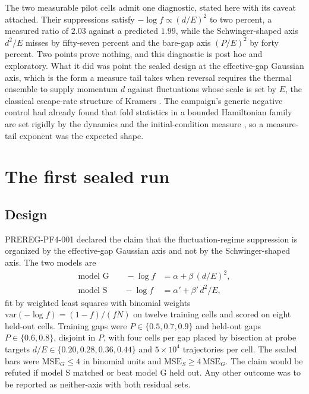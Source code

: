 \documentclass[aps,prd,reprint,nofootinbib,longbibliography]{revtex4-2}
\begin{document}
The two measurable pilot cells admit one diagnostic, stated here with its
caveat attached.  Their suppressions satisfy
$-\log f \propto (d/E)^{2}$ to two percent, a measured ratio of $2.03$
against a predicted $1.99$, while the Schwinger-shaped axis $d^{2}/E$
misses by fifty-seven percent and the bare-gap axis $(P/E)^{2}$ by forty
percent.  Two points prove nothing, and this diagnostic is post hoc and
exploratory.  What it did was point the sealed design at the effective-gap
Gaussian axis, which is the form a measure tail takes when reversal
requires the thermal ensemble to supply momentum $d$ against fluctuations
whose scale is set by $E$, the classical escape-rate structure of Kramers
\cite{Kramers1940}.  The campaign's generic negative control had already
found that fold statistics in a bounded Hamiltonian family are set
rigidly by the dynamics and the initial-condition measure
\cite{ZenodoEntropy}, so a measure-tail exponent was the expected shape.

\section{The first sealed run}
\label{sec:run1}

\subsection{Design}

PREREG-PF4-001 declared the claim that the fluctuation-regime suppression
is organized by the effective-gap Gaussian axis and not by the
Schwinger-shaped axis.  The two models are
\begin{align}
\text{model G}\qquad -\log f &= \alpha + \beta\,(d/E)^{2},
\label{eq:modelg}\\
\text{model S}\qquad -\log f &= \alpha' + \beta'\,d^{2}/E,
\label{eq:models}
\end{align}
fit by weighted least squares with binomial weights
$\mathrm{var}(-\log f) = (1-f)/(fN)$ on twelve training cells and scored
on eight held-out cells.  Training gaps were $P \in \{0.5, 0.7, 0.9\}$
and held-out gaps $P \in \{0.6, 0.8\}$, disjoint in $P$, with four cells
per gap placed by bisection at probe targets
$d/E \in \{0.20, 0.28, 0.36, 0.44\}$ and $5\times10^{4}$ trajectories
per cell.  The sealed bars were $\mathrm{MSE}_{G} \le 4$ in binomial
units and $\mathrm{MSE}_{S} \ge 4\,\mathrm{MSE}_{G}$.  The claim would be
refuted if model S matched or beat model G held out.  Any other outcome
was to be reported as neither-axis with both residual sets.
\end{document}

